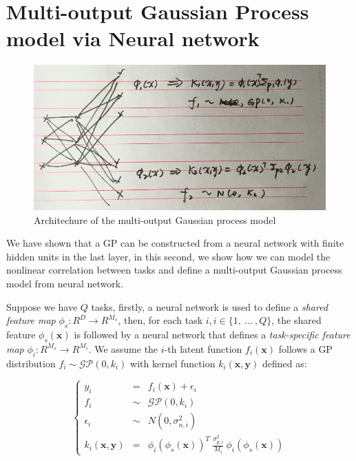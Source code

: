 \section{Multi-output Gaussian Process model via Neural network}

\begin{figure}[!htb]
    \centering
    \includegraphics[width=\columnwidth]{./img/NN-MOGP.png}
    \caption{Architechure of the multi-output Gaussian process model}
    \label{fig:MONNGP}
\end{figure}

We have shown that a GP can be constructed from a neural network with finite hidden units in the last layer, in this second, we show how we can model the nonlinear correlation between tasks and define a multi-output Gaussian process model from neural network. 

Suppose we have $Q$ tasks, firstly, a neural network is used to define a \emph{shared feature map} $\phi_s : R^D \rightarrow R^{M_s}$, then, for each task $i, i \in \{1,~\dots~,Q\}$, the shared feature $\phi_s(\bm{x})$ is followed by a neural network that defines a \emph{task-specific feature map} $\phi_i : R^{M_s} \rightarrow R^{M_i}$. We assume the $i$-th latent function $f_i(\bm{x})$ follows a GP distribution $f_i \sim \mathcal{GP}(0, k_i)$ with kernel function $k_i(\bm{x}, \bm{y})$ defined as:

\begin{equation}
    \label{eq:mo_kernel}
    \left\{
    \begin{array}{lll}
        y_i                 &=&    f_i(\bm{x}) + \epsilon_i  \\
        f_i                 &\sim& \mathcal{GP}(0, k_i)      \\
        \epsilon_i          &\sim& N(0, \sigma_{n, i}^2)     \\
        k_i(\bm{x}, \bm{y}) &=&    \phi_i(\phi_s(\bm{x}))^T~\frac{\sigma_{p, i}^2}{M_i}~\phi_i(\phi_s(\bm{x}))
    \end{array}
    \right.
\end{equation}

